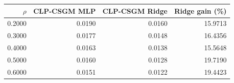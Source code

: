 \begin{tabular}{rrrr}
\toprule
$\rho$ & CLP-CSGM MLP & CLP-CSGM Ridge & Ridge gain (\%) \\
\midrule
0.2000 & 0.0190 & 0.0160 & 15.9713 \\
0.3000 & 0.0177 & 0.0148 & 16.4356 \\
0.4000 & 0.0163 & 0.0138 & 15.5648 \\
0.5000 & 0.0160 & 0.0128 & 19.7190 \\
0.6000 & 0.0151 & 0.0122 & 19.4423 \\
\bottomrule
\end{tabular}
